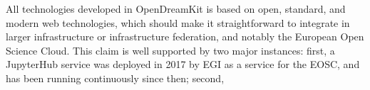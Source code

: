 \documentclass{deliverablereport}
\begin{document}
All technologies developed in OpenDreamKit is based on open, standard,
and modern web technologies, which should make it straightforward to
integrate in larger infrastructure or infrastructure federation, and
notably the European Open Science Cloud. This claim is well supported
by two major instances: first, a JupyterHub service was deployed in
2017 by EGI as a service for the EOSC, and has been running
continuously since then; second, 





\end{document}
